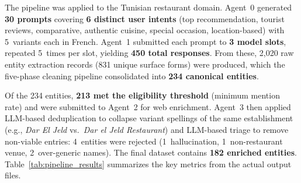 The pipeline was applied to the Tunisian restaurant domain. Agent~0 generated
\textbf{30 prompts} covering \textbf{6 distinct user intents} (top recommendation,
tourist reviews, comparative, authentic cuisine, special occasion, location-based)
with 5~variants each in French. Agent~1 submitted each prompt to
\textbf{3 model slots}, repeated 5~times per slot, yielding \textbf{450 total
responses}. From these, 2{,}020 raw entity extraction records (831 unique surface
forms) were produced, which the five-phase cleaning pipeline consolidated into
\textbf{234 canonical entities}.

Of the 234 entities, \textbf{213 met the eligibility threshold} (minimum mention
rate) and were submitted to Agent~2 for web enrichment. Agent~3 then applied
LLM-based deduplication to collapse variant spellings of the same establishment
(e.g., \textit{Dar El Jeld} vs.\ \textit{Dar el Jeld Restaurant}) and
LLM-based triage to remove non-viable entries: 4~entities were rejected
(1~hallucination, 1~non-restaurant venue, 2~over-generic names). The final
dataset contains \textbf{182 enriched entities}. Table~\ref{tab:pipeline_results}
summarizes the key metrics from the actual output files.

